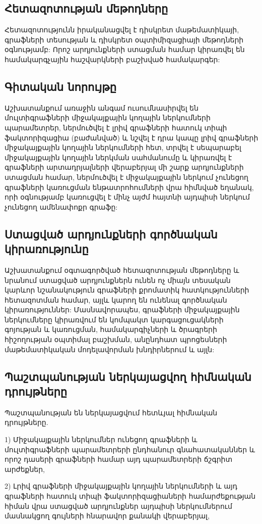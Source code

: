 \subsection*{Հետազոտության մեթոդները}
Հետազոտությունն իրականացվել է դիսկրետ մաթեմատիկայի, գրաֆների տեսության և դիսկրետ օպտիմիզացիայի մեթոդների օգնությամբ: Որոշ արդյունքների ստացման համար կիրառվել են համակարգչային հաշվարկների բաշխված համակարգեր:


\subsection*{Գիտական նորույթը}
Աշխատանքում առաջին անգամ ուսումնասիրվել են մուլտիգրաֆների միջակայքային կողային ներկումների պարամետրեր, ներմուծվել է լրիվ գրաֆների հատուկ տիպի ֆակտորիզացիա (բաժանված) և նշվել է դրա կապը լրիվ գրաֆների միջակայքային կողային ներկումների հետ, տրվել է սեպարաբել միջակայքային կողային ներկման սահմանումը և կիրառվել է գրաֆների արտադրյալների վերաբերյալ մի շարք արդյունքների ստացման համար, ներմուծվել է միջակայքային ներկում չունեցող գրաֆների կառուցման ենթատրոհումների վրա հիմնված եղանակ, որի օգնությամբ կառուցվել է մինչ այժմ հայտնի այդպիսի ներկում չունեցող ամենափոքր գրաֆը:


\subsection*{Ստացված արդյունքների գործնական կիրառությունը}
Աշխատանքում օգտագործված հետազոտության մեթոդները և նրանում ստացված արդյունքներն ունեն ոչ միայն տեսական կարևոր նշանակություն գրաֆների քրոմատիկ հատկությունների հետազոտման համար, այլև կարող են ունենալ գործնական կիրառություններ: Մասնավորապես, գրաֆների միջակայքային ներկումները կիրառվում են կոմպակտ կարգացուցակների գոյության և կառուցման, համակարգիչների և ծրագրերի հիշողության օպտիմալ բաշխման, անընդհատ պրոցեսների մաթեմատիկական մոդելավորման խնդիրներում և այլն: 



\subsection*{Պաշտպանության ներկայացվող հիմնական դրույթները}
Պաշտպանության են ներկայացվում հետևյալ հիմնական դրույթները.

1) Միջակայքային ներկումներ ունեցող գրաֆների և մուլտիգրաֆների պարամետրերի ընդհանուր գնահատականներ և որոշ դասերի գրաֆների համար այդ պարամետրերի ճշգրիտ արժեքներ,

2) Լրիվ գրաֆների միջակայքային կողային ներկումների և այդ գրաֆների հատուկ տիպի ֆակտորիզացիաների համարժեքության հիման վրա ստացված արդյունքներ այդպիսի ներկումներում մասնակցող գույների հնարավոր քանակի վերաբերյալ,


